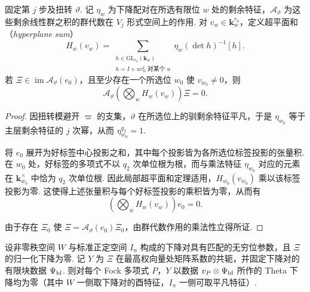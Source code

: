 \begin{lemma}[好形式部分上的超平面和消失]
\label{lem:c-false-hyperplane}
\emitthmsource
固定第 $j$ 步及扭转 $\vartheta$. 记 $\eta_w$ 为下降配对在所选有限位 $w$ 处的剩余特征，$\mathcal A_\vartheta$ 为这些剩余线性群之积的群代数在 $V_j$ 形式空间上的作用. 对 $v_w\in\mathbf k_w^{r_0}$，定义超平面和（\emph{hyperplane sum}）
\[
 H_w(v_w)=
 \sum_{\substack{h\in\mathrm{GL}_{r_0}(\mathbf k_w)\\
                  h=I+u v_w^{\mathsf t}\ \text{对某个 }u}}
     \eta_w(\det h)^{-1}[h] .
\]
若 $\Xi\in\operatorname{im}\mathcal A_\vartheta(e_0)$，且至少存在一个所选位 $w_0$ 使 $v_{w_0}\ne0$，则
\[
 \mathcal A_\vartheta\left(\bigotimes_w H_w(v_w)\right)\Xi=0 .
\]
\end{lemma}

\begin{proof}
因扭转模避开 $\varpi$ 的支集，$\vartheta$ 在所选位上的驯剩余特征平凡，于是 $\eta_{w_0}$ 等于主层剩余特征的 $j$ 次幂，从而 $\eta_{w_0}^{q_2}=1$.

将 $e_0$ 展开为好标签中心投影之和，其中每个投影皆为各所选位标签投影的张量积. 在 $w_0$ 处，好标签的多项式不以 $q_2$ 次单位根为根，而与乘法特征 $\eta_{w_0}$ 对应的元素在 $\mathbf k_{w_0}^\times$ 中恰为 $q_2$ 次单位根. 因此局部超平面和定理适用，$H_{w_0}(v_{w_0})$ 乘以该标签投影为零. 这使得上述张量积与每个好标签投影的乘积皆为零，从而有
\[
 \left(\bigotimes_w H_w(v_w)\right)e_0=0.
\]

由于存在 $\Xi_0$ 使 $\Xi=\mathcal A_\vartheta(e_0)\Xi_0$，由群代数作用的乘法性立得所证.
\end{proof}

\begin{lemma}[塔底从联合调和数据推广到多项式数据]
\label{lem:c-false-bottom-polynomials}
\emitthmsource
设非零秩空间 $W$ 与标准正定空间 $I_n$ 构成的下降对具有匹配的无穷位参数，且 $\Xi$ 的归一化下降为零. 记 $Y$ 为 $\Xi$ 在最高权向量处矩阵系数的共轭，并固定下降对的有限块数据 $\Psi_{\rm bl}$. 则对每个 Fock 多项式 $P$，$Y$ 以数据 $v_P\otimes\Psi_{\rm bl}$ 所作的 Theta 下降均为零（其中 $W$ 一侧取下降对的酉特征，$I_n$ 一侧可取平凡特征）.
\end{lemma}

